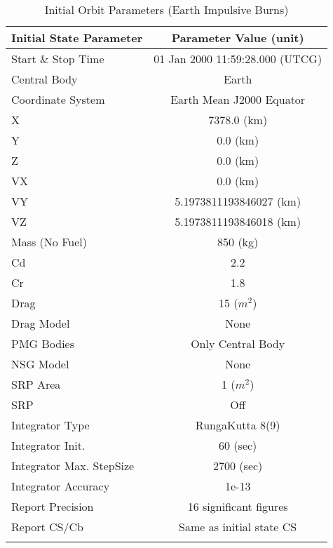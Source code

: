 \begin{table}[htbp!]
\centering \caption{Initial Orbit Parameters (Earth Impulsive
Burns)}
      \begin{tabular}{lc}
      \hline\hline
            Initial State Parameter & Parameter Value (unit)\\
            \hline
            Start \& Stop Time & 01 Jan 2000 11:59:28.000 (UTCG)\\
            Central Body & Earth\\
            Coordinate System & Earth Mean J2000 Equator\\
            X & 7378.0 (km)\\
            Y & 0.0 (km)\\
            Z & 0.0 (km)\\
            VX & 0.0 (km)\\
            VY & 5.1973811193846027 (km)\\
            VZ & 5.1973811193846018 (km)\\
            Mass (No Fuel) & 850 (kg)\\
            Cd & 2.2\\
            Cr & 1.8\\
            Drag & 15 ($m^2$)\\
            Drag Model & None\\
            PMG Bodies & Only Central Body\\
            NSG Model & None\\
            SRP Area & 1 ($m^2$)\\
            SRP & Off\\
            Integrator Type & RungaKutta 8(9)\\
            Integrator Init. & 60 (sec)\\
            Integrator Max. StepSize & 2700 (sec)\\
            Integrator Accuracy & 1e-13\\
            Report Precision & 16 significant figures\\
            Report CS/Cb & Same as initial state CS\\
      \hline\hline
      \label{Table: InitDVStateEarthImpulse}
\end{tabular}
\end{table}

